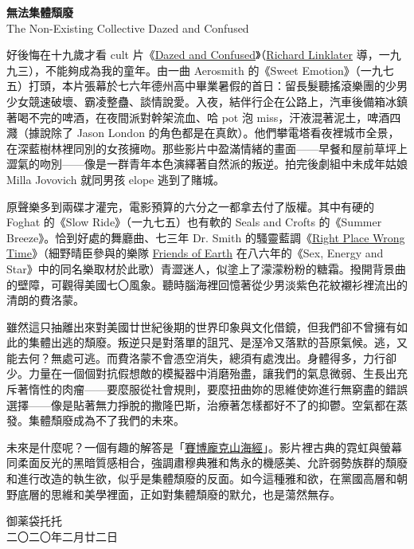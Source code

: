 \documentclass[10pt]{article}
\begin{document}
\begin{flushleft}
\textbf{無法集體頹廢}\\
The Non-Existing Collective Dazed and Confused\\
\end{flushleft}
\vspace{3em}

好後悔在十九歲才看 cult
片《\href{https://en.wikipedia.org/wiki/Dazed_and_Confused_(film)}{Dazed
and
Confused}》（\href{https://en.wikipedia.org/wiki/Richard_Linklater}{Richard
Linklater} 導，一九九三），不能夠成為我的童年。由一曲 Aerosmith
的《Sweet
Emotion》（一九七五）打頭，本片張幕於七六年德州高中畢業暑假的首日：留長髮聽搖滾樂團的少男少女競速破壞、霸凌整蠱、談情說愛。入夜，結伴行企在公路上，汽車後備箱冰鎮著喝不完的啤酒，在夜間派對幹架流血、哈
pot 泡 miss，汗液混著泥土，啤酒四濺（據說除了 Jason London
的角色都是在真飲）。他們攀電塔看夜裡城市全景，在深藍樹林裡同別的女孩擁吻。那些影片中盈滿情緒的畫面{——}早餐和屋前草坪上澀氣的吻別{——}像是一群青年本色演繹著自然派的叛逆。拍完後劇組中未成年姑娘
Milla Jovovich 就同男孩 elope 逃到了賭城。

原聲樂多到兩碟才灌完，電影預算的六分之一都拿去付了版權。其中有硬的
Foghat 的《Slow Ride》（一九七五）也有軟的 Seals and Crofts 的《Summer
Breeze》。恰到好處的舞廳曲、七三年 Dr. Smith
的騷靈藍調《\href{https://en.wikipedia.org/wiki/Right_Place,_Wrong_Time_(song)}{Right
Place Wrong Time}》（細野晴臣參與的樂隊
\href{https://ja.wikipedia.org/wiki/\%E3\%83\%95\%E3\%83\%AC\%E3\%83\%B3\%E3\%82\%BA\%E3\%83\%BB\%E3\%82\%AA\%E3\%83\%96\%E3\%83\%BB\%E3\%82\%A2\%E3\%83\%BC\%E3\%82\%B9}{Friends
of Earth} 在八六年的《Sex, Energy and
Star》中的同名樂取材於此歌）青澀迷人，似塗上了濛濛粉粉的糖霜。撥開背景曲的壁障，可觀得美國七〇風象。聽時腦海裡回憶著從少男淡紫色花紋襯衫裡流出的清朗的費洛蒙。

雖然這只抽離出來對美國廿世紀後期的世界印象與文化借鏡，但我們卻不曾擁有如此的集體出逃的頹廢。叛逆只是對落單的詛咒、是溼冷又落默的苔原氣候。逃，又能去何？無處可逃。而費洛蒙不會憑空消失，總須有處洩出。身體得多，力行卻少。力量在一個個對抗假想敵的模擬器中消磨殆盡，讓我們的氣息微弱、生長出充斥著惰性的肉瘤{——}要麼服從社會規則，要麼扭曲妳的思維使妳進行無窮盡的錯誤選擇{——}像是貼著無力掙脫的撒隆巴斯，治療著怎樣都好不了的抑鬱。空氣都在蒸發。集體頹廢成為不了我們的未來。

未來是什麼呢？一個有趣的解答是「\href{https://www.behance.net/gallery/88971815/Pause-Originals-Cyberpunk-Shaihaiching}{賽博龐克山海經}」。影片裡古典的霓虹與螢幕同柔面反光的黑暗質感相合，強調肅穆典雅和雋永的機感美、允許弱勢族群的頹廢和進行改造的執生欲，似乎是集體頹廢的反面。如今這種雅和欲，在黨國高層和朝野底層的思維和美學裡面，正如對集體頹廢的默允，也是蕩然無存。

\vspace{3em}
\begin{flushleft}
\small{御薬袋托托\\
二〇二〇年二月廿二日}
\end{flushleft}
\end{document}
